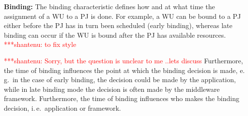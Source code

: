 \documentclass[conference,final]{IEEEtran}
\newcommand{\jhanote}[1]{ {\textcolor{red} { ***shantenu: #1 }}}
\newcommand{\alnote}[1]{ {\textcolor{blue} { ***andre: #1 }}}
\newcommand{\alnote}[1]{}
\newcommand{\jhanote}[1]{}
\begin{document}
\textbf{Binding:} The binding characteristic defines how and at what time the
assignment of a WU to a PJ is done. For example, a WU can be bound to a PJ
either before the PJ has in turn been scheduled (early binding), whereas late
binding can occur if the WU is bound after the PJ has available resources.
\jhanote{to fix style}




\jhanote{Sorry, but the question is unclear to me ..lets discuss}
Furthermore, the time of binding influences the point at which the
binding decision is made, e.\,g.\ in the case of early binding, the
decision could be made by the application, while in late binding mode
the decision is often made by the middleware framework.  Furthermore,
the time of binding influences who makes the binding decision, i.\,e.\
application or framework.



\end{document}
